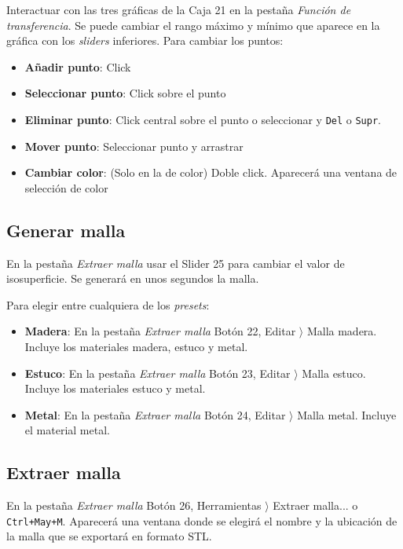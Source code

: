 Interactuar con las tres gráficas de la Caja 21 en la pestaña \textit{Función de transferencia}. Se puede cambiar el rango máximo y mínimo que aparece en la gráfica con los \textit{sliders} inferiores. Para cambiar los puntos: 

\begin{itemize}
	\item \textbf{Añadir punto}: Click
	\item \textbf{Seleccionar punto}: Click sobre el punto
	\item \textbf{Eliminar punto}: Click central sobre el punto o seleccionar y \texttt{Del} o \texttt{Supr}.
	\item \textbf{Mover punto}: Seleccionar punto y arrastrar
	\item \textbf{Cambiar color}: (Solo en la de color) Doble click. Aparecerá una ventana de selección de color
\end{itemize}

\subsection{Generar malla}

En la pestaña \textit{Extraer malla} usar el Slider 25 para cambiar el valor de isosuperficie. Se generará en unos segundos la malla.

Para elegir entre cualquiera de los \textit{presets}:

\begin{itemize}
	\item \textbf{Madera}: En la pestaña \textit{Extraer malla} Botón 22, Editar $ \rangle $ Malla madera. Incluye los materiales madera, estuco y metal.
	\item \textbf{Estuco}: En la pestaña \textit{Extraer malla} Botón 23, Editar $ \rangle $ Malla estuco. Incluye los materiales estuco y metal.
	\item \textbf{Metal}: En la pestaña \textit{Extraer malla} Botón 24, Editar $ \rangle $ Malla metal. Incluye el material metal.
\end{itemize}

\subsection{Extraer malla}

En la pestaña \textit{Extraer malla} Botón 26, Herramientas $ \rangle $ Extraer malla... o \texttt{Ctrl+May+M}. Aparecerá una ventana donde se elegirá el nombre y la ubicación de la malla que se exportará en formato STL.

